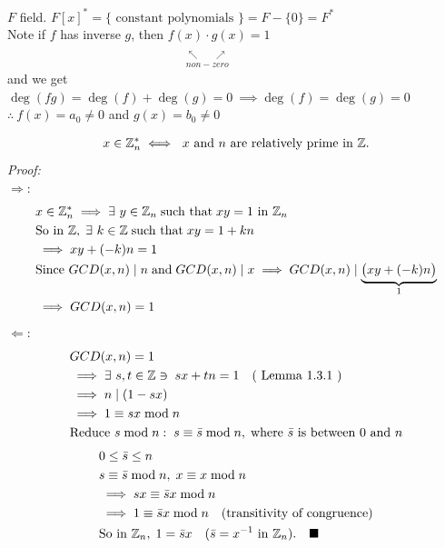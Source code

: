 \begin{example}
    $F$ field. $F[x]^* = \{\text{ constant polynomials }\} = F-\{0\}=F^*$ \\ \steezybreak
    \noindent Note if $f$ has inverse $g$, then $\underset{\substack{\ \\ \nwarrow \ \ \ \ \ \ \ \nearrow \\ non-zero}}{f(x)\cdot g(x)}=1$ \\ 
    \noindent and we get $\deg(fg)=\deg(f)+\deg(g)=0 \ \implies \deg(f)=\deg(g)=0$ \\
\noindent $\therefore \ f(x)=a_0 \neq 0$ and $g(x)=b_0 \neq 0$ \\
\end{example}
\newpage
\begin{proposition}
    \begin{align}
        x\in {\mathbb{ Z}}_n^* \iff \ x \text{ and } n \text{ are relatively prime in }{\mathbb{ Z}}. \nonumber 
    \end{align}
    \textit{Proof:}\\
    \noindent $\Rightarrow :$
    \begin{align*}
        &x \in {\mathbb{ Z}}_n^* \implies \exists \ y \in {\mathbb{ Z}}_n \; \text{such that} \; xy =1 \text{ in }{\mathbb{ Z}}_n \\
        &\text{So in } {\mathbb{ Z}}, \; \exists \ k \in {\mathbb{ Z}} \; \text{such that} \; xy = 1 + kn \\
        &\implies xy + (-k)n = 1 \\
        &\text{Since } GCD(x, n) \mid n \; \text{and} \; GCD(x, n) \mid x \implies GCD(x, n) \mid \underbrace{\big(xy + (-k)n\big)}_{1} \\
        &\implies GCD(x, n) = 1
    \end{align*}
    $\Leftarrow :$
    \begin{align*}
        &GCD(x, n) = 1 \\
        &\implies \exists \ s, t \in {\mathbb{ Z}} \ni \; sx + tn = 1 \quad \text{( Lemma 1.3.1 )} \\
        &\implies n \mid (1 - sx) \\
        &\implies 1 \equiv sx \bmod n \\
        &\text{Reduce } s \bmod n: \; s \equiv \bar{s} \bmod n, \; \text{where } \bar{s} \text{ is between } 0 \text{ and } n
    \end{align*}
    \begin{align*}
        &0 \leq \bar{s} \leq n \\
        &s \equiv \bar{s} \bmod n, \; x \equiv x \bmod n \\
        &\implies sx \equiv \bar{s}x \bmod n  \\
        &\implies 1\equiv \bar{s}x \bmod n \quad \text{(transitivity of congruence)} \\
        &\text{So in } {\mathbb{ Z}}_n, \; 1 = \bar{s}x \ \ \ (\bar{s}=x^{-1} \text{ in }{\mathbb{ Z}}_n) . \ \ \ \blacksquare
    \end{align*}
\end{proposition}

